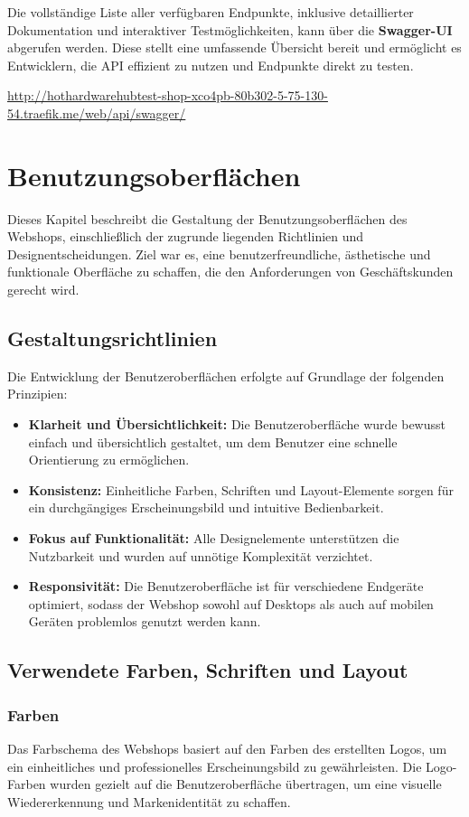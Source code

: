 \documentclass[%
	12pt,
	a4paper,
	oneside,
	parskip=full
]{scrbook}
\begin{document}
Die vollständige Liste aller verfügbaren Endpunkte, inklusive detaillierter Dokumentation und interaktiver Testmöglichkeiten, kann über die \textbf{Swagger-UI} abgerufen werden. Diese stellt eine umfassende Übersicht bereit und ermöglicht es Entwicklern, die API effizient zu nutzen und Endpunkte direkt zu testen.

\url{http://hothardwarehubtest-shop-xco4pb-80b302-5-75-130-54.traefik.me/web/api/swagger/}

\chapter{Benutzungsoberflächen}
Dieses Kapitel beschreibt die Gestaltung der Benutzungsoberflächen des Webshops, einschließlich der zugrunde liegenden Richtlinien und Designentscheidungen. Ziel war es, eine benutzerfreundliche, ästhetische und funktionale Oberfläche zu schaffen, die den Anforderungen von Geschäftskunden gerecht wird.

\section{Gestaltungsrichtlinien}
Die Entwicklung der Benutzeroberflächen erfolgte auf Grundlage der folgenden Prinzipien:
\begin{itemize}
	\item \textbf{Klarheit und Übersichtlichkeit:} Die Benutzeroberfläche wurde bewusst einfach und übersichtlich gestaltet, um dem Benutzer eine schnelle Orientierung zu ermöglichen.
	\item \textbf{Konsistenz:} Einheitliche Farben, Schriften und Layout-Elemente sorgen für ein durchgängiges Erscheinungsbild und intuitive Bedienbarkeit.
	\item \textbf{Fokus auf Funktionalität:} Alle Designelemente unterstützen die Nutzbarkeit und wurden auf unnötige Komplexität verzichtet.
	\item \textbf{Responsivität:} Die Benutzeroberfläche ist für verschiedene Endgeräte optimiert, sodass der Webshop sowohl auf Desktops als auch auf mobilen Geräten problemlos genutzt werden kann.
\end{itemize}

\section{Verwendete Farben, Schriften und Layout}
\subsection{Farben}
Das Farbschema des Webshops basiert auf den Farben des erstellten Logos, um ein einheitliches und professionelles Erscheinungsbild zu gewährleisten. Die Logo-Farben wurden gezielt auf die Benutzeroberfläche übertragen, um eine visuelle Wiedererkennung und Markenidentität zu schaffen.
\end{document}
